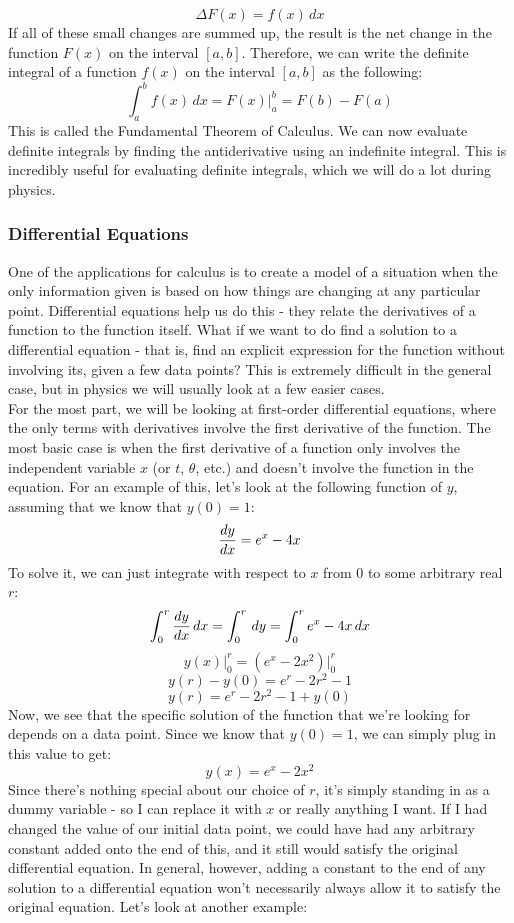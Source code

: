 \[
	\Delta F(x) = f(x) \, dx
\]
If all of these small changes are summed up, the result is the net change in the function $F(x)$ on the interval $[a, b]$. Therefore, we can write the definite integral of a function $f(x)$ on the interval $[a, b]$ as the following:
\[
	\int_a^b f(x) \, dx = F(x)\Big|_a^b = F(b) - F(a) 
\] 
This is called the Fundamental Theorem of Calculus. We can now evaluate definite integrals by finding the antiderivative using an indefinite integral. This is incredibly useful for evaluating definite integrals, which we will do a lot during physics. 

\subsubsection{Differential Equations}
One of the applications for calculus is to create a model of a situation when the only information given is based on how things are changing at any particular point. Differential equations help us do this - they relate the derivatives of a function to the function itself. What if we want to do find a solution to a differential equation - that is, find an explicit expression for the function without involving its, given a few data points? This is extremely difficult in the general case, but in physics we will usually look at a few easier cases. \\
For the most part, we will be looking at first-order differential equations, where the only terms with derivatives involve the first derivative of the function. The most basic case is when the first derivative of a function only involves the independent variable $x$ (or $t$, $\theta$, etc.) and doesn't involve the function in the equation. For an example of this, let's look at the following function of $y$, assuming that we know that $y(0) = 1$:
\[
	\frac{d y}{d x} = e^{x} - 4x
\]
To solve it, we can just integrate with respect to $x$ from $0$ to some arbitrary real $r$: 
\[
	\int_0^r \frac{d y}{d x} \, dx = \int_0^r \, dy = \int_0^r e^{x} - 4x \, dx
\]
\[
	y(x)\Big|_0^r = (e^x - 2x^2)\Big|_0^r
\]
\[
	y(r) - y(0) = e^r - 2r^2 - 1
\]
\[
	y(r) = e^r - 2r^2 - 1 + y(0)
\]
Now, we see that the specific solution of the function that we're looking for depends on a data point. Since we know that $y(0) = 1$, we can simply plug in this value to get:
\[
	y(x) = e^x - 2x^2
\]
Since there's nothing special about our choice of $r$, it's simply standing in as a dummy variable - so I can replace it with $x$ or really anything I want. If I had changed the value of our initial data point, we could have had any arbitrary constant added onto the end of this, and it still would satisfy the original differential equation. In general, however, adding a constant to the end of any solution to a differential equation won't necessarily always allow it to satisfy the original equation. Let's look at another example: 

